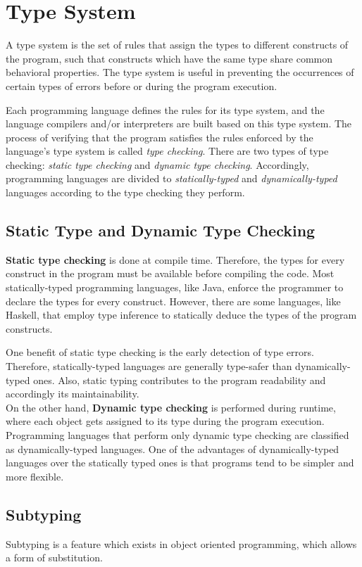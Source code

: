 \section{Type System}
A type system is the set of rules that assign the types to different constructs of the program, such that constructs which have the same type share common behavioral properties. The type system is useful in preventing the occurrences of certain types of errors before or during the program execution.

Each programming language defines the rules for its type system, and the language compilers and/or interpreters are built based on this type system. The process of verifying that the program satisfies the rules enforced by the language's type system is called \textit{type checking}. There are two types of type checking: \textit{static type checking} and \textit{dynamic type checking}. Accordingly, programming languages are divided to \textit{statically-typed} and \textit{dynamically-typed} languages according to the type checking they perform.

\subsection{Static Type and Dynamic Type Checking}

\textbf{Static type checking} is done at compile time. Therefore, the types for every construct in the program must be available before compiling the code. Most statically-typed programming languages, like Java, enforce the programmer to declare the types for every construct. However, there are some languages, like Haskell, that employ type inference to statically deduce the types of the program constructs.

One benefit of static type checking is the early detection of type errors. Therefore, statically-typed languages are generally type-safer than dynamically-typed ones. Also, static typing contributes to the program readability and accordingly its maintainability.\\

On the other hand, \textbf{Dynamic type checking} is performed during runtime, where each object gets assigned to its type during the program execution. Programming languages that perform only dynamic type checking are classified as dynamically-typed languages. One of the advantages of dynamically-typed languages over the statically typed ones is that programs tend to be simpler and more flexible.


\subsection{Subtyping}
Subtyping is a feature which exists in object oriented programming, which allows a form of substitution.

